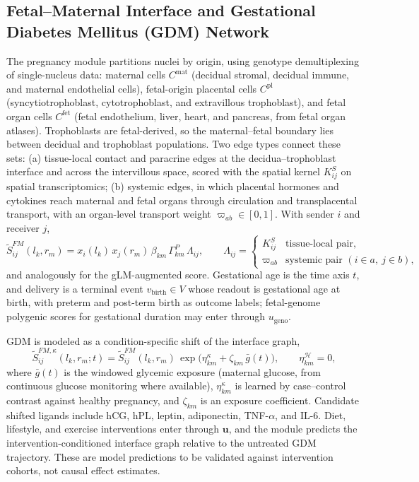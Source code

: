 \documentclass[11pt]{article}
\begin{document}
\subsection{Fetal--Maternal Interface and Gestational Diabetes Mellitus (GDM) Network}
\label{sec:pregnancy}
The pregnancy module partitions nuclei by origin, using genotype demultiplexing of single-nucleus data: maternal cells $C^{\text{mat}}$ (decidual stromal, decidual immune, and maternal endothelial cells), fetal-origin placental cells $C^{\text{pl}}$ (syncytiotrophoblast, cytotrophoblast, and extravillous trophoblast), and fetal organ cells $C^{\text{fet}}$ (fetal endothelium, liver, heart, and pancreas, from fetal organ atlases). Trophoblasts are fetal-derived, so the maternal--fetal boundary lies between decidual and trophoblast populations. Two edge types connect these sets: (a) tissue-local contact and paracrine edges at the decidua--trophoblast interface and across the intervillous space, scored with the spatial kernel $K^S_{ij}$ on spatial transcriptomics; (b) systemic edges, in which placental hormones and cytokines reach maternal and fetal organs through circulation and transplacental transport, with an organ-level transport weight $\varpi_{ab}\in[0,1]$. With sender $i$ and receiver $j$,
\begin{equation}
\widetilde{S}^{FM}_{ij}(l_k,r_m)=x_i(l_k)\,x_j(r_m)\,\beta_{km}\,\Gamma^{P}_{km}\,\Lambda_{ij},\qquad
\Lambda_{ij}=\begin{cases}K^S_{ij} & \text{tissue-local pair},\\ \varpi_{ab} & \text{systemic pair } (i\in a,\ j\in b),\end{cases}
\end{equation}
and analogously for the gLM-augmented score. Gestational age is the time axis $t$, and delivery is a terminal event $v_{\text{birth}}\in V$ whose readout is gestational age at birth, with preterm and post-term birth as outcome labels; fetal-genome polygenic scores for gestational duration may enter through $u_{\text{geno}}$.

GDM is modeled as a condition-specific shift of the interface graph,
\begin{equation}
\widetilde{S}^{FM,\kappa}_{ij}(l_k,r_m;t)=\widetilde{S}^{FM}_{ij}(l_k,r_m)\,\exp\!\big(\eta^{\kappa}_{km}+\zeta_{km}\,\bar{g}(t)\big),\qquad \eta^{\mathcal{H}}_{km}=0,
\end{equation}
where $\bar{g}(t)$ is the windowed glycemic exposure (maternal glucose, from continuous glucose monitoring where available), $\eta^{\kappa}_{km}$ is learned by case--control contrast against healthy pregnancy, and $\zeta_{km}$ is an exposure coefficient. Candidate shifted ligands include hCG, hPL, leptin, adiponectin, TNF-$\alpha$, and IL-6. Diet, lifestyle, and exercise interventions enter through $\mathbf{u}$, and the module predicts the intervention-conditioned interface graph relative to the untreated GDM trajectory. These are model predictions to be validated against intervention cohorts, not causal effect estimates.
\end{document}
